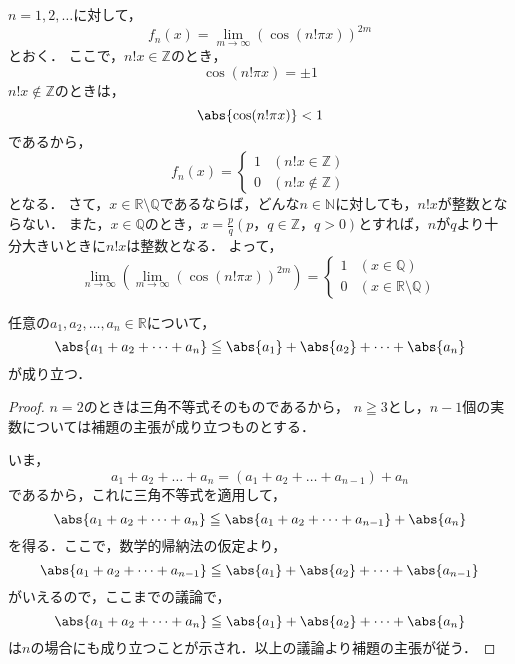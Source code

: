 \begin{tanswer}
    $n=1,2,\ldots$に対して，
    \[
        f_{n} (x)=\lim_{m \to \infty} (\cos (n! \pi x)) ^{2m}
    \]
    とおく．
    ここで，$n!x \in \mathbb{Z}$のとき，
    \[
        \cos (n! \pi x)=\pm 1
    \]
    $n!x \notin \mathbb{Z}$のときは，
    \[
        \abs{\cos (n! \pi x)}<1
    \]
    であるから，
    \[
        f_{n} (x)=
        \begin{cases}
            1 & (n!x \in \mathbb{Z})    \\
            0 & (n!x \notin \mathbb{Z})
        \end{cases}
    \]
    となる．
    さて，$x \in \mathbb{R} \setminus \mathbb{Q}$であるならば，どんな$n \in \mathbb{N}$に対しても，$n! x$が整数とならない．
    また，$x \in \mathbb{Q}$のとき，$ x=\frac{p}{q}(p，q \in \mathbb{Z}，q>0)$とすれば，$n$が$q$より十分大きいときに$n!x$は整数となる．
    よって，
    \[
        \lim_{n \to \infty} \left( \lim_{m \to \infty} (\cos (n! \pi x)) ^{2m} \right)=
        \begin{cases}
            1 & (x \in \mathbb{Q})                      \\
            0 & (x \in \mathbb{R} \setminus \mathbb{Q})
        \end{cases}
    \]
\end{tanswer}



\begin{lemma}{}{}
    任意の$a_1 , a_2 , \dots, a_n \in \mathbb{R}$について，
    \[
        \abs{a_1+a_2+\dots+a_n} \leqq \abs{a_1}+\abs{a_2}+\dots+\abs{a_n}
    \]
    が成り立つ．
\end{lemma}


\begin{proof}
    $n=2$のときは三角不等式そのものであるから，
    $n \geqq 3$とし，$n-1$個の実数については補題の主張が成り立つものとする．

    いま，
    \[
        a_1 + a_2 + \dots + a_n = (a_1+a_2+\dots+a_{n-1})+a_n
    \]
    であるから，これに三角不等式を適用して，
    \[
        \abs{a_1+a_2+\dots+a_n} \leqq \abs{a_1+a_2+\dots+a_{n-1}} +\abs{a_n}
    \]
    を得る．ここで，数学的帰納法の仮定より，
    \[
        \abs{a_1+a_2+\dots+a_{n-1}} \leqq \abs{a_1}+\abs{a_2}+\dots+\abs{a_{n-1}}
    \]
    がいえるので，ここまでの議論で，
    \[
        \abs{a_1+a_2+\dots+a_n} \leqq \abs{a_1}+\abs{a_2}+\dots+\abs{a_n}
    \]
    は$n$の場合にも成り立つことが示され．以上の議論より補題の主張が従う．
\end{proof}


